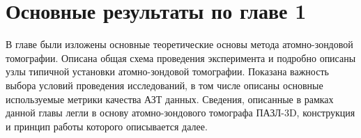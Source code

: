 \FloatBarrier

\section{Основные результаты по главе 1}\label{sec:ch1/sec6}

В главе были изложены основные теоретические основы метода атомно-зондовой томографии. Описана общая схема проведения эксперимента и подробно описаны узлы типичной установки атомно-зондовой томографии. Показана важность выбора условий проведения исследований, в том числе описаны основные используемые метрики качества АЗТ данных. Сведения, описанные в рамках данной главы легли в основу атомно-зондового томографа ПАЗЛ-3D, конструкция и принцип работы которого описывается далее.




























